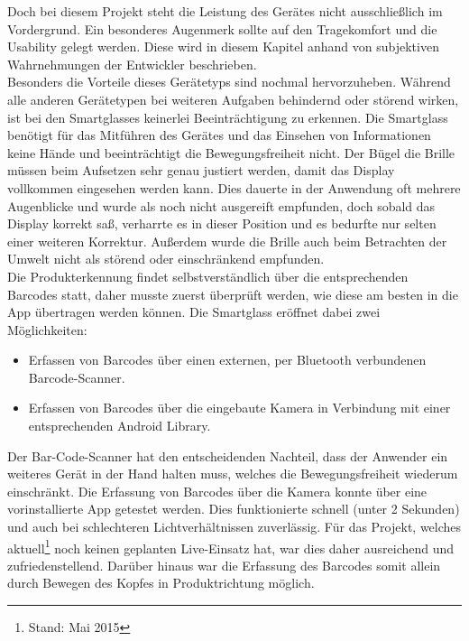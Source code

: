 Doch bei diesem Projekt steht die Leistung des Gerätes nicht ausschließlich im Vordergrund. Ein besonderes Augenmerk sollte auf den Tragekomfort und die Usability gelegt werden. Diese wird in diesem Kapitel anhand von subjektiven Wahrnehmungen der Entwickler beschrieben.\\

Besonders die Vorteile dieses Gerätetyps sind nochmal hervorzuheben. Während alle anderen Gerätetypen bei weiteren Aufgaben behindernd oder störend wirken, ist bei den Smartglasses keinerlei Beeinträchtigung zu erkennen. Die Smartglass benötigt für das Mitführen des Gerätes und das Einsehen von Informationen keine Hände und beeinträchtigt die Bewegungsfreiheit nicht. Der Bügel \bzw die Brille müssen beim Aufsetzen sehr genau justiert werden, damit das Display vollkommen eingesehen werden kann. Dies dauerte in der Anwendung oft mehrere Augenblicke und wurde als noch nicht ausgereift empfunden, doch sobald das Display korrekt saß, verharrte es in dieser Position und es bedurfte nur selten einer weiteren Korrektur. Außerdem wurde die Brille auch beim Betrachten der Umwelt nicht als störend oder einschränkend empfunden.\\

Die Produkterkennung findet selbstverständlich über die entsprechenden Barcodes statt, daher musste zuerst überprüft werden, wie diese am besten in die App übertragen werden können. Die Smartglass eröffnet dabei zwei Möglichkeiten:
\begin{itemize}
	\item Erfassen von Barcodes über einen externen, per Bluetooth verbundenen Barcode-Scanner.
	\item Erfassen von Barcodes über die eingebaute Kamera in Verbindung mit einer entsprechenden Android Library.
\end{itemize}
Der Bar-Code-Scanner hat den entscheidenden Nachteil, dass der Anwender ein weiteres Gerät in der Hand halten muss, welches die Bewegungsfreiheit wiederum einschränkt. Die Erfassung von Barcodes über die Kamera konnte über eine vorinstallierte App getestet werden. Dies funktionierte schnell (unter 2 Sekunden) und auch bei schlechteren Lichtverhältnissen zuverlässig. Für das Projekt, welches aktuell\footnote{Stand: Mai 2015} noch keinen geplanten Live-Einsatz hat, war dies daher ausreichend und zufriedenstellend. Darüber hinaus war die Erfassung des Barcodes somit allein durch Bewegen des Kopfes in Produktrichtung möglich.\\

